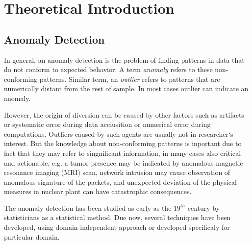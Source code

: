 
\chapter{Theoretical Introduction} \label{ch:theory}

\section{Anomaly Detection}

In general, an anomaly detection is the problem of finding patterns in data that do not 
conform to expected behavior.
A term \emph{anomaly}  refers to these non-conforming patterns. Similar term, an \emph{outlier}
refers to patterns that are numerically distant from the rest of sample.
In most cases outlier can indicate an anomaly. 

However, the origin of diversion can be 
caused by other factors such as artifacts or systematic error during data acciusition
or numerical error during computations. 
Outliers caused by such agents are usually not in
researcher`s interest. But the  knowledge about non-conforming patterns is inportant due to fact that they may refer
to singnificant information, in many cases also critical and actionable, 
e.g. a tumor presence may be indicated by anomalous magnetic resonance imaging (MRI) scan, 
network intrusion may cause observation of anomalous signature of the packets, and unexpected 
deviation of the physical measures in nuclear plant can have catastrophic consequences. 

The anomaly detection has been studied as early as the $19^{th}$ century by 
statisticians as a statistical method.
Due now, several techniques have been developed, using domain-independent approach 
or developed specificaly for particular domain. %


